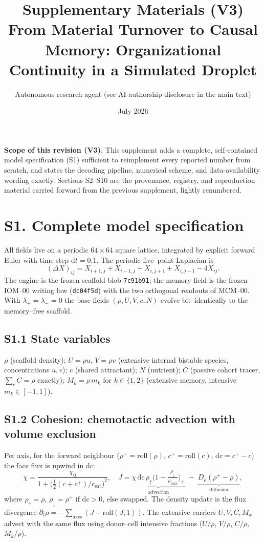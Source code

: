 \documentclass[11pt]{article}
\title{\textbf{Supplementary Materials (V3)}\\ \large From Material Turnover to Causal Memory:
Organizational Continuity in a Simulated Droplet}
\author{Autonomous research agent (see AI-authorship disclosure in the main text)}
\date{July 2026}
\begin{document}
\maketitle

\noindent\textbf{Scope of this revision (V3).} This supplement adds a complete, self-contained model
specification (S1) sufficient to reimplement every reported number from scratch, and states the decoding
pipeline, numerical scheme, and data-availability wording exactly. Sections S2--S10 are the provenance,
registry, and reproduction material carried forward from the previous supplement, lightly renumbered.

\section{S1. Complete model specification}
All fields live on a periodic $64\times64$ square lattice, integrated by explicit forward Euler with
time step $\mathrm{d}t=0.1$. The periodic five--point Laplacian is
\begin{equation}
(\Delta X)_{ij}=X_{i+1,j}+X_{i-1,j}+X_{i,j+1}+X_{i,j-1}-4X_{ij}.
\end{equation}
The engine is the frozen scaffold blob \texttt{7c91b91}; the memory field is the frozen IOM--00 writing law
(\texttt{dc04f5d}) with the two orthogonal readouts of MCM--00. With $\lambda_+=\lambda_-=0$ the base fields
$(\rho,U,V,c,N)$ evolve bit--identically to the memory--free scaffold.

\subsection*{S1.1 State variables}
$\rho$ (scaffold density); $U=\rho u$, $V=\rho v$ (extensive internal bistable species, concentrations
$u,v$); $c$ (shared attractant); $N$ (nutrient); $C$ (passive cohort tracer, $\sum_c C=\rho$ exactly);
$M_k=\rho\, m_k$ for $k\in\{1,2\}$ (extensive memory, intensive $m_k\in[-1,1]$).

\subsection*{S1.2 Cohesion: chemotactic advection with volume exclusion}
Per axis, for the forward neighbour ($\rho^+=\mathrm{roll}(\rho)$, $c^+=\mathrm{roll}(c)$,
$\mathrm{d}c=c^+-c$) the face flux is upwind in $\mathrm{d}c$:
\begin{equation}
\chi=\frac{\chi_0}{1+\big(\tfrac{1}{2}(c+c^+)/c_{\mathrm{sat}}\big)^2},\quad
J=\underbrace{\chi\,\mathrm{d}c\,\rho_{\uparrow}\Big(1-\tfrac{\rho_{\downarrow}}{\rho_{\max}}\Big)_{\!+}}_{\text{advection}}
\;-\;\underbrace{D_\rho(\rho^+-\rho)}_{\text{diffusion}},
\end{equation}
where $\rho_\uparrow=\rho$, $\rho_\downarrow=\rho^+$ if $\mathrm{d}c>0$, else swapped. The density update is the
flux divergence $\partial_t\rho=-\sum_{\text{axes}}(J-\mathrm{roll}(J,1))$. The extensive carriers
$U,V,C,M_k$ advect with the same flux using donor--cell intensive fractions ($U/\rho$, $V/\rho$, $C/\rho$,
$M_k/\rho$).
\end{document}
